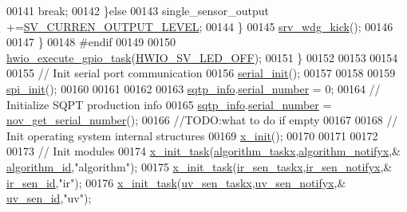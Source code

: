\begin{DoxyCode}
00141                          \textcolor{keywordflow}{break};
00142                      \}\textcolor{keywordflow}{else}
00143                         single\_sensor\_output +=\hyperlink{a00021_a648a6327bd26d3d2f537bbea230c6ffb}{SV\_CURREN\_OUTPUT\_LEVEL};
00144                  \}
00145               \hyperlink{a00067_a710d148845397582739d170341f3d3d9}{srv\_wdg\_kick}();
00146         
00147             \}
00148 \textcolor{preprocessor}{    #endif}
00149 
00150     \hyperlink{a00058_a0af9eae455fbdf4e77def5bfffa109cb}{hwio\_execute\_gpio\_task}(\hyperlink{a00058_a8fe69ad7e533d2e88cec53c22a56f8fb}{HWIO\_SV\_LED\_OFF});
00151     \}
00152 
00153        
00154  
00155     \textcolor{comment}{// Init serial port communication}
00156     \hyperlink{a00031_ad2b461e9e9044364a28a61cfadcacdd8}{serial\_init}();
00157    
00158 
00159     \hyperlink{a00013_ae909944aa85ae98323073c628be541aa}{spi\_init}();
00160 
00161 
00162   
00163     \hyperlink{a00048_a4e1e8b365cce7a6d497671681eb5823c}{sqtp\_info}.\hyperlink{a00033_a728c5fe7bc16e168a8f93fba18ee5561}{serial\_number} = 0;
00164     \textcolor{comment}{// Initialize SQPT production info}
00165     \hyperlink{a00048_a4e1e8b365cce7a6d497671681eb5823c}{sqtp\_info}.\hyperlink{a00033_a728c5fe7bc16e168a8f93fba18ee5561}{serial\_number} = \hyperlink{a00029_a86b863ea185628aff5a00b4defbbb6e1}{nov\_get\_serial\_number}();
00166     \textcolor{comment}{//TODO:what to do if empty}
00167  
00168     \textcolor{comment}{// Init operating system internal structures}
00169     \hyperlink{a00036_a05f27d3148e368ee84a448f3c4b083dd}{x\_init}();        
00170     
00171     
00172 
00173     \textcolor{comment}{// Init modules}
00174     \hyperlink{a00036_a1e79db5ed3ab326586129eb4d7b63d46}{x\_init\_task}(\hyperlink{a00021_a1d182ae18a9176c2a1e28cc654dc0e43}{algorithm\_taskx},\hyperlink{a00021_a93269cdec3e21934aa9395440a2de605}{algorithm\_notifyx},&
      \hyperlink{a00021_aff3e3d622fcd96787628167d3c1856f9}{algorithm\_id},\textcolor{stringliteral}{"algorithm"});
00175     \hyperlink{a00036_a1e79db5ed3ab326586129eb4d7b63d46}{x\_init\_task}(\hyperlink{a00017_a24529100c87dfc257e9b56f7f0bcfa78}{ir\_sen\_taskx},\hyperlink{a00017_a36c6c2cdf9aa5844371e742330789dad}{ir\_sen\_notifyx},&
      \hyperlink{a00017_a624782f67b3870f0dde83528770ef5fc}{ir\_sen\_id},\textcolor{stringliteral}{"ir"});
00176     \hyperlink{a00036_a1e79db5ed3ab326586129eb4d7b63d46}{x\_init\_task}(\hyperlink{a00020_ab4e931568892f0b46a2571d3c480f5c8}{uv\_sen\_taskx},\hyperlink{a00020_ae2617634df4d3055161f7fb1f148f6da}{uv\_sen\_notifyx},&
      \hyperlink{a00020_afd789f3f9ea182d28d4f16db0d8d5652}{uv\_sen\_id},\textcolor{stringliteral}{"uv"});

\end{DoxyCode}
